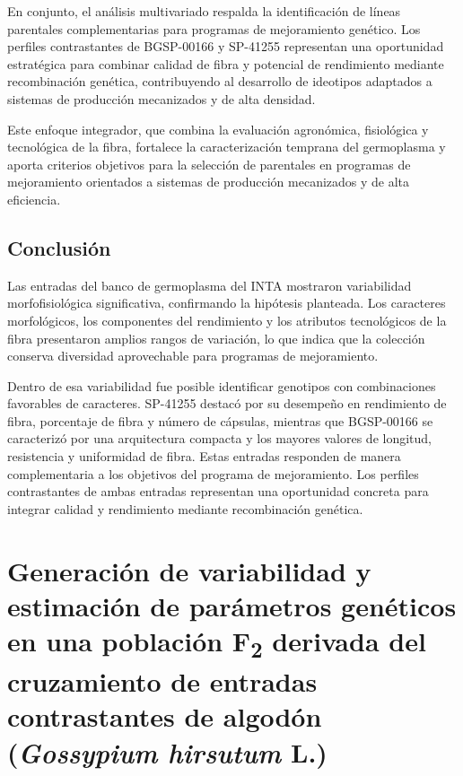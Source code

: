 \documentclass[12pt,oneside]{reedthesis}
\begin{document}
En conjunto, el análisis multivariado respalda la identificación de líneas parentales complementarias para programas de mejoramiento genético. Los perfiles contrastantes de BGSP-00166 y SP-41255 representan una oportunidad estratégica para combinar calidad de fibra y potencial de rendimiento mediante recombinación genética, contribuyendo al desarrollo de ideotipos adaptados a sistemas de producción mecanizados y de alta densidad.

Este enfoque integrador, que combina la evaluación agronómica, fisiológica y tecnológica de la fibra, fortalece la caracterización temprana del germoplasma y aporta criterios objetivos para la selección de parentales en programas de mejoramiento orientados a sistemas de producción mecanizados y de alta eficiencia.

\section{Conclusión}\label{conclusiuxf3n}

Las entradas del banco de germoplasma del INTA mostraron variabilidad morfofisiológica significativa, confirmando la hipótesis planteada. Los caracteres morfológicos, los componentes del rendimiento y los atributos tecnológicos de la fibra presentaron amplios rangos de variación, lo que indica que la colección conserva diversidad aprovechable para programas de mejoramiento.

Dentro de esa variabilidad fue posible identificar genotipos con combinaciones favorables de caracteres. SP-41255 destacó por su desempeño en rendimiento de fibra, porcentaje de fibra y número de cápsulas, mientras que BGSP-00166 se caracterizó por una arquitectura compacta y los mayores valores de longitud, resistencia y uniformidad de fibra. Estas entradas responden de manera complementaria a los objetivos del programa de mejoramiento. Los perfiles contrastantes de ambas entradas representan una oportunidad concreta para integrar calidad y rendimiento mediante recombinación genética.

\chapter{\texorpdfstring{Generación de variabilidad y estimación de parámetros genéticos en una población F\textsubscript{2} derivada del cruzamiento de entradas contrastantes de algodón (\emph{Gossypium hirsutum} L.)}{Generación de variabilidad y estimación de parámetros genéticos en una población F2 derivada del cruzamiento de entradas contrastantes de algodón (Gossypium hirsutum L.)}}\label{math-sci}
\end{document}
